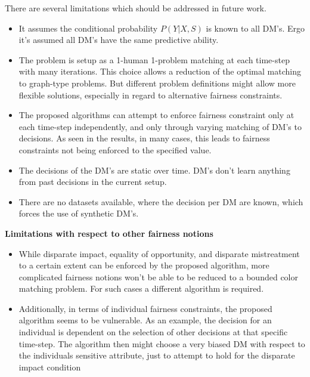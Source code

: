 \documentclass[11pt,a4paper,final]{article}
\begin{document}
There are several limitations which should be addressed in future work.
\begin{itemize}
  \item It assumes the conditional probability $P(Y|X,S)$ is known to all DM's. Ergo it's assumed all DM's have the same predictive ability. 
  \item The problem is setup as a 1-human 1-problem matching at each time-step with many iterations. This choice allows a reduction of the optimal matching to graph-type problems. But different problem definitions might allow more flexible solutions, especially in regard to alternative fairness constraints.
  \item The proposed algorithms can attempt to enforce fairness constraint only at each time-step independently, and only through varying matching of DM's to decisions. As seen in the results, in many cases, this leads to fairness constraints not being enforced to the specified value.
  \item The decisions of the DM's are static over time. DM's don't learn anything from past decisions in the current setup. \item There are no datasets available, where the decision per DM are known, which forces the use of synthetic DM's. 

\end{itemize}
\textbf{Limitations with respect to other fairness notions}
\begin{itemize}
\item While disparate impact, equality of opportunity, and disparate mistreatment to a certain extent can be enforced by the proposed algorithm, more complicated fairness notions won't be able to be reduced to a bounded color matching problem. For such cases a different algorithm is required. 
\item Additionally, in terms of individual fairness constraints, the proposed algorithm seems to be vulnerable. As an example, the decision for an individual is dependent on the selection of other decisions at that specific time-step. The algorithm then might choose a very biased DM with respect to the individuals sensitive attribute, just to attempt to hold for the disparate impact condition
\end{itemize}
\end{document}
